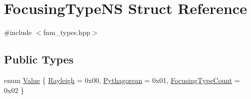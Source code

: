 \hypertarget{structfnm_1_1FocusingTypeNS}{\section{Focusing\+Type\+N\+S Struct Reference}
\label{structfnm_1_1FocusingTypeNS}
}


{\ttfamily \#include $<$fnm\+\_\+types.\+hpp$>$}

\subsection*{Public Types}
\begin{DoxyCompactItemize}
\item 
enum \hyperlink{structfnm_1_1FocusingTypeNS_a896c037a32087c5c20d97e64a1786880}{Value} \{ \hyperlink{structfnm_1_1FocusingTypeNS_a896c037a32087c5c20d97e64a1786880a0195cdd3cb4c40ddf163a3782d48936f}{Rayleigh} = 0x00, 
\hyperlink{structfnm_1_1FocusingTypeNS_a896c037a32087c5c20d97e64a1786880a072ba1096c769c0c70e56a63a8d93416}{Pythagorean} = 0x01, 
\hyperlink{structfnm_1_1FocusingTypeNS_a896c037a32087c5c20d97e64a1786880aca1b9feb4a36651bdd9f16eb92675052}{Focusing\+Type\+Count} = 0x02
 \}
\end{DoxyCompactItemize}


